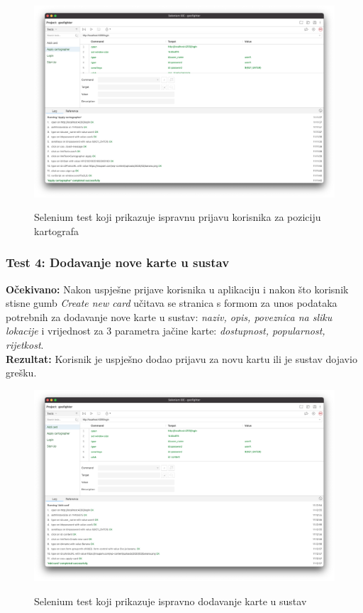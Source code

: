 			\begin{figure}[H]
				\centering
				\includegraphics[scale=0.27]{slike/SeleniumCartographerTest.png} \\
				\caption{ Selenium test koji prikazuje ispravnu prijavu korisnika za poziciju kartografa}
				\label{fig:SeleniumCartographerTest}
			\end{figure}

			\subsubsection{Test 4: Dodavanje nove karte u sustav}
			\textbf{Očekivano: } Nakon uspješne prijave korisnika u aplikaciju i nakon što korisnik stisne gumb \textit{Create new card} učitava se stranica s formom za unos podataka potrebnih za dodavanje nove karte u sustav: \textit{naziv, opis, poveznica na sliku lokacije} i vrijednost za 3 parametra jačine karte:  \textit{dostupnost, popularnost, rijetkost}.\\
			\textbf{Rezultat: } Korisnik  je uspješno dodao prijavu za novu kartu ili  je  sustav  dojavio grešku.\\

			\begin{figure}[H]
				\centering
				\includegraphics[scale=0.27]{slike/SeleniumCardSuccess.png} \\
				\caption{ Selenium test koji prikazuje ispravno dodavanje karte u sustav}
				\label{fig:SeleniumCartographerSuccess}
			\end{figure}

